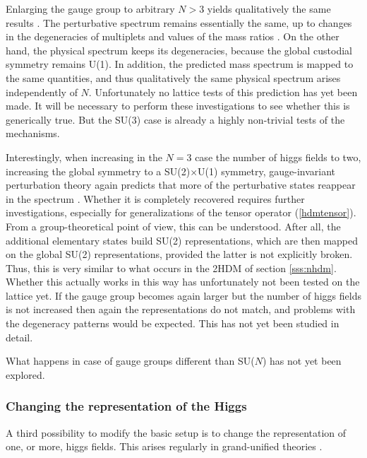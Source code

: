 \documentclass[final,12pt,3p,longtitle]{elsarticle}
\newcommand*{\pref}[1]{(\ref{#1})}
\newcommand*{\1}{1\!\!\!\bot}
\begin{document}
Enlarging the gauge group to arbitrary $N>3$ yields qualitatively the same results \cite{Maas:2017xzh}. The perturbative spectrum remains essentially the same, up to changes in the degeneracies of multiplets and values of the mass ratios \cite{Bohm:2001yx,Maas:2017xzh}. On the other hand, the physical spectrum keeps its degeneracies, because the global custodial symmetry remains U(1). In addition, the predicted mass spectrum is mapped to the same quantities, and thus qualitatively the same physical spectrum arises independently of $N$. Unfortunately no lattice tests of this prediction has yet been made. It will be necessary to perform these investigations to see whether this is generically true. But the SU(3) case is already a highly non-trivial tests of the mechanisms.

Interestingly, when increasing in the $N=3$ case the number of higgs fields to two, increasing the global symmetry to a SU(2)$\times$U(1) symmetry, gauge-invariant perturbation theory again predicts that more of the perturbative states reappear in the spectrum \cite{Torek:2015ssa,Maas:2017xzh}. Whether it is completely recovered requires further investigations, especially for generalizations of the tensor operator \pref{hdmtensor}. From a group-theoretical point of view, this can be understood. After all, the additional elementary states build SU(2) representations, which are then mapped on the global SU(2) representations, provided the latter is not explicitly broken. Thus, this is very similar to what occurs in the 2HDM of section \ref{sss:nhdm}. Whether this actually works in this way has unfortunately not been tested on the lattice yet. If the gauge group becomes again larger but the number of higgs fields is not increased then again the representations do not match, and problems with the degeneracy patterns would be expected. This has not yet been studied in detail.

What happens in case of gauge groups different than SU($N$) has not yet been explored.

\subsubsection{Changing the representation of the Higgs}\label{sss:rep}

A third possibility to modify the basic setup is to change the representation of one, or more, higgs fields. This arises regularly in grand-unified theories \cite{Bohm:2001yx,Langacker:1980js}.
\end{document}
